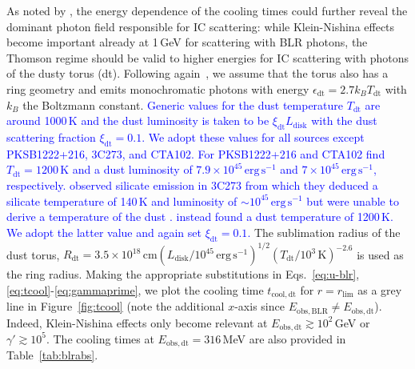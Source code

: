 \documentclass[twocolumn,linenumbers]{aastex62}
\newcommand{\response}[1]{\textcolor{blue}{#1}}
\begin{document}
  
As noted by \citet{2012ApJ...758L..15D}, the energy dependence of the cooling times could  further reveal the dominant photon field responsible for IC scattering: while Klein-Nishina effects become important already at 1\,GeV for scattering with BLR photons, the Thomson regime should be valid to higher energies for IC scattering with photons of the dusty torus (dt). 
Following again~\citet{finke2016}, we assume that the torus also has a ring geometry and emits monochromatic photons with energy $\epsilon_\mathrm{dt} = 2.7 k_B T_\mathrm{dt}$ with $k_B$ the Boltzmann constant.
\response{
Generic values for the dust temperature $T_\mathrm{dt}$ are around 1000\,K and the dust luminosity is taken to be $\xi_\mathrm{dt}L_\mathrm{disk}$ with the dust scattering fraction $\xi_\mathrm{dt} = 0.1$.
We adopt these values for all sources except 
 PKSB1222+216, 3C273, and CTA102. 
 For PKSB1222+216 and CTA102  \citet{2011ApJ...732..116M} find $T_\mathrm{dt} = 1200\,$K and a dust luminosity of $7.9\times10^{45}\,\mathrm{erg}\,\mathrm{s}^{-1}$ and $7\times10^{45}\,\mathrm{erg}\,\mathrm{s}^{-1}$, respectively. 
\citet{2005ApJ...625L..75H} observed silicate emission in 3C273 from which they deduced a silicate temperature of 140\,K and luminosity of $\sim 10^{45}\,\mathrm{erg}\,\mathrm{s}^{-1}$ but were unable to derive a temperature of the dust \citep[see also the discussion in][]{2011ApJ...732..116M}. \citet{2008A&A...486..411S} instead found a dust temperature of 1200\,K.
We adopt the latter value and again set $\xi_\mathrm{dt} = 0.1$.
}
The sublimation radius of the dust torus, $R_\mathrm{dt} = 3.5\times10^{18}\,\mathrm{cm}(L_\mathrm{disk}/10^{45}\,\mathrm{erg}\,\mathrm{s}^{-1})^{1/2}(T_\mathrm{dt}/10^3\,\mathrm{K})^{-2.6}$ is used as the ring radius. 
Making the appropriate substitutions in Eqs.~\ref{eq:u-blr}, \ref{eq:tcool}-\ref{eq:gammaprime}, we plot the cooling time $t_\mathrm{cool,dt}$ for $r = r_\mathrm{lim}$ as a grey line in Figure~\ref{fig:tcool} (note the additional $x$-axis since $E_\mathrm{obs, BLR} \neq E_\mathrm{obs,dt}$). 
Indeed, Klein-Nishina effects only become relevant at $E_\mathrm{obs,dt} \gtrsim 10^2\,$GeV or $\gamma' \gtrsim 10^5$. The cooling times at $E_\mathrm{obs,dt} = 316\,$MeV are also provided in Table~\ref{tab:blrabs}.
\end{document}
